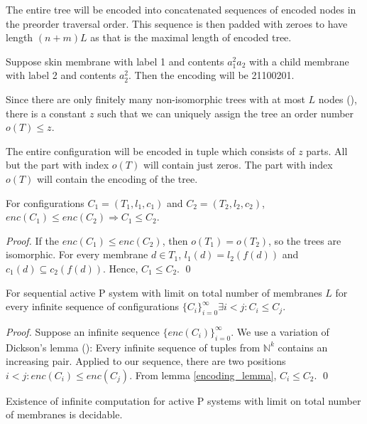 \documentclass[llncs,submission,copyright,creativecommons]{../lib/lncs/llncs}
\begin{document}
The entire tree will be encoded into concatenated sequences of encoded nodes in the preorder traversal order. This sequence is then padded with zeroes to have length $(n+m)L$ as that is the maximal length of encoded tree.

\begin{example}
  Suppose skin membrane with label 1 and contents $a_1^2a_2$ with a child membrane with label 2 and contents $a_2^2$. Then the encoding will be 21100201.
\end{example} 

Since there are only finitely many non-isomorphic trees with at most $L$ nodes (\cite{Cayley1881RootedTrees}), there is a constant $z$ such that we can uniquely assign the tree an order number $o(T) \leq z$.

The entire configuration will be encoded in tuple which consists of $z$ parts. All but the part with index $o(T)$ will contain just zeros. The part with index $o(T)$ will contain the encoding of the tree.

\begin{lemma}
\label{encoding_lemma}
  For configurations $C_1 = (T_1, l_1, c_1)$ and $C_2 = (T_2, l_2, c_2)$, $enc(C_1) \leq enc(C_2)\Rightarrow C_1\leq C_2$.
\end{lemma}

\begin{proof}
  If the $enc(C_1)\leq enc(C_2)$, then $o(T_1)=o(T_2)$, so the trees are isomorphic. For every membrane $d\in T_1$, $l_1(d)=l_2(f(d))$ and $c_1(d)\subseteq c_2(f(d))$. Hence, $C_1\leq C_2$.
  \qed
\end{proof}

\begin{lemma}
\label{infinite_sequence_of_configurations_lemma}
  For sequential active P system with limit on total number of membranes $L$ for every infinite sequence of configurations $\{C_i\}_{i=0}^\infty\exists i<j: C_i\leq C_j$.
\end{lemma}

\begin{proof}
  Suppose an infinite sequence $\{enc(C_i)\}_{i=0}^\infty$. We use a variation of Dickson's lemma (\cite{Figueira11Dickson}): Every infinite sequence of tuples from $\mathbb N^k$ contains an increasing pair. Applied to our sequence, there are two positions $i<j: enc(C_i)\leq enc(C_j)$. From lemma \ref{encoding_lemma}, $C_i\leq C_2$.
  \qed
\end{proof}

\begin{theorem}
  Existence of infinite computation for active P systems with limit on total number of membranes is decidable.
\end{theorem}
\end{document}
